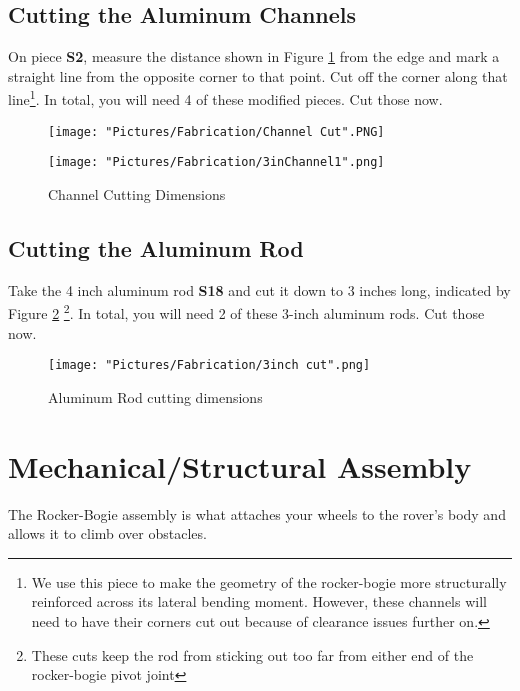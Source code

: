 \documentclass[12pt]{article}
\begin{document}
\subsection{Cutting the Aluminum Channels}
On piece \textbf{S2}, measure the distance shown in Figure \ref {channel dimensions} from the edge and mark a straight line from the opposite corner to that point. Cut off the corner along that line\footnote{We use this piece to make the geometry of the rocker-bogie more structurally reinforced across its lateral bending moment. However, these channels will need to have their corners cut out because of clearance issues further on.}. In total, you will need 4 of these modified pieces. Cut those now.

\begin{figure}[H]
  \centering
  \begin{minipage}[b]{0.45\textwidth}
    \texttt{[image: "Pictures/Fabrication/Channel Cut".PNG]}
  \end{minipage}
  \hfill
  \begin{minipage}[b]{0.45\textwidth}
    \texttt{[image: "Pictures/Fabrication/3inChannel1".png]}
  \end{minipage}
  \caption{Channel Cutting Dimensions}
  \label{channel dimensions}
\end{figure}


\subsection{Cutting the Aluminum Rod}

Take the 4 inch aluminum rod \textbf{S18} and cut it down to 3 inches long, indicated by Figure \ref{rod cut} \footnote{These cuts keep the rod from sticking out too far from either end of the rocker-bogie pivot joint}. In total, you will need 2 of these 3-inch aluminum rods. Cut those now.

\begin{figure}[H]
	\centering
	\texttt{[image: "Pictures/Fabrication/3inch cut".png]}
	\caption{Aluminum Rod cutting dimensions}
	\label{rod cut}
\end{figure}

\section{Mechanical/Structural Assembly}

The Rocker-Bogie assembly is what attaches your wheels to the rover's body and allows it to climb over obstacles.
\end{document}
